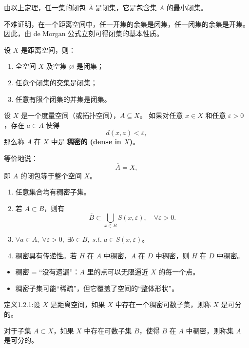 由以上定理，任一集的闭包 $\overline{A}$ 是闭集，它是包含集 $A$ 的最小闭集。

不难证明，在一个距离空间中，任一开集的余集是闭集，任一闭集的余集是开集。
因此，由 de Morgan 公式立刻可得闭集的基本性质。
\begin{theorem}[闭集性质]
设 $X$ 是距离空间，则：
\begin{enumerate}
  \item 全空间 $X$ 及空集 $\varnothing$ 是闭集；
  \item 任意个闭集的交集是闭集；
  \item 任意有限个闭集的并集是闭集。
\end{enumerate}
\end{theorem}
\begin{definition}[稠密子集]
设 $X$ 是一个度量空间（或拓扑空间），$A \subseteq X$。  
如果对任意 $x \in X$ 和任意 $\varepsilon > 0$，存在 $a \in A$ 使得
\[
d(x,a) < \varepsilon,
\]
那么称 $A$ 在 $X$ 中是 \textbf{稠密的 (dense in $X$)}。

等价地说：
\[
\overline{A} = X,
\]
即 $A$ 的闭包等于整个空间 $X$。
\end{definition}

\begin{remark}[直观理解]
\begin{enumerate}
  \item 任意集合均有稠密子集。
  \item 若 $A \subset \overline{B}$，则有
  \[
    \overline{B} \subset \bigcup_{x \in B} S(x,\varepsilon), \quad \forall \varepsilon > 0.
  \]
  \item $\forall a \in A, \; \forall \varepsilon > 0, \; \exists b \in B, \; s.t.\; a \in S(x,\varepsilon)$。
  \item 稠密具有传递性。若 $H$ 在 $A$ 中稠密，$A$ 在 $D$ 中稠密，则 $H$ 在 $D$ 中稠密。
\end{enumerate}
\begin{itemize}
  \item 稠密 = “没有遗漏”：$A$ 里的点可以无限逼近 $X$ 的每一个点。
  \item 稠密子集可能“稀疏”，但它覆盖了空间的“整体形状”。
\end{itemize}
\end{remark}
\begin{definition}
定义1.2.1:设 $X$ 是距离空间，如果 $X$ 中存在一个稠密可数子集，则称 $X$ 是可分的。  

对于子集 $A \subset X$，如果 $X$ 中存在可数子集 $B$，使得 $B$ 在 $A$ 中稠密，则称集 $A$ 是可分的。
\end{definition}

